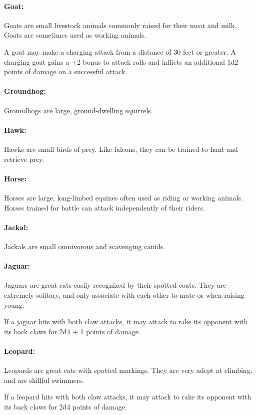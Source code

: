 \begin{multicols}{2}
\paragraph{Goat:} Goats are small livestock animals commonly raised for their meat and milk. Goats are sometimes used as working animals.

A goat may make a charging attack from a distance of 30 feet or greater. A charging goat gains a +2 bonus to attack rolls and inflicts an additional 1d2 points of damage on a successful attack.

\paragraph{Groundhog:} Groundhogs are large, ground-dwelling squirrels.

\paragraph{Hawk:} Hawks are small birds of prey. Like falcons, they can be trained to hunt and retrieve prey.

\paragraph{Horse:} Horses are large, long-limbed equines often used as riding or working animals. Horses trained for battle can attack independently of their riders.

\paragraph{Jackal:} Jackals are small omnivorous and scavenging canids.

\paragraph{Jaguar:} Jaguars are great cats easily recognized by their spotted coats. They are extremely solitary, and only associate with each other to mate or when raising young.

If a jaguar hits with both claw attacks, it may attack to rake its opponent with its back claws for 2d4 + 1 points of damage.

\paragraph{Leopard:} Leopards are great cats with spotted markings. They are very adept at climbing, and are skillful swimmers.

If a leopard hits with both claw attacks, it may attack to rake its opponent with its back claws for 2d4 points of damage.

\end{multicols}

